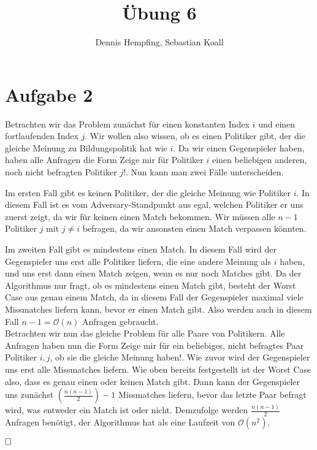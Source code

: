 \documentclass[12pt]{scrartcl}%
\theoremstyle{nonumberplain}
\newcommand{\bO}[1]{\mathcal O(#1)}
\begin{document}
\author{Dennis Hempfing, Sebastian Koall}
\title{Übung 6}
\date{} 
\pagestyle{myheadings}

\maketitle %

\section*{Aufgabe 2}

Betrachten wir das Problem zunächst für einen konstanten Index $i$ und einen fortlaufenden Index $j$. Wir wollen also wissen, ob es einen Politiker gibt, der die gleiche Meinung zu Bildungspolitik hat wie $i$. Da wir einen Gegenspieler haben, haben alle Anfragen die Form \glqq Zeige mir für Politiker $i$ einen beliebigen anderen, noch nicht befragten Politiker $j$!\grqq. Nun kann man zwei Fälle unterscheiden. 

Im ersten Fall gibt es keinen Politiker, der die gleiche Meinung wie Politiker $i$. In diesem Fall ist es vom Adversary-Standpunkt aus egal, welchen Politiker er uns zuerst zeigt, da wir für keinen einen Match bekommen. Wir müssen alle $n-1$ Politiker $j$ mit $j \not= i$ befragen, da wir ansonsten einen Match verpassen könnten.

Im zweiten Fall gibt es mindestens einen Match. In diesem Fall wird der Gegenspieler uns erst alle Politiker liefern, die eine andere Meinung als $i$ haben, und uns erst dann einen Match zeigen, wenn es nur noch Matches gibt. Da der Algorithmus nur fragt, ob es mindestens einen Match gibt, besteht der Worst Case aus genau einem Match, da in diesem Fall der Gegenspieler maximal viele Missmatches liefern kann, bevor er einen Match gibt. Also werden auch in diesem Fall $n-1 = \bO{n}$ Anfragen gebraucht.\\

Betrachten wir nun das gleiche Problem für alle Paare von Politikern. Alle Anfragen haben nun die Form \glqq Zeige mir für ein beliebiges, nicht befragtes Paar Politiker $i, j$, ob sie die gleiche Meinung haben!\grqq. Wie zuvor wird der Gegenspieler uns erst alle Missmatches liefern. Wie oben bereits festgestellt ist der Worst Case also, dass es genau einen oder keinen Match gibt. Dann kann der Gegenspieler uns zunächst $(\frac{n(n-1)}{2})-1$ Missmatches liefern, bevor das letzte Paar befragt wird, was entweder ein Match ist oder nicht. Demzufolge werden $\frac{n(n-1)}{2}$ Anfragen benötigt, der Algorithmus hat als eine Laufzeit von $\bO{n^2}$.

$\hfill \square$
\end{document}
